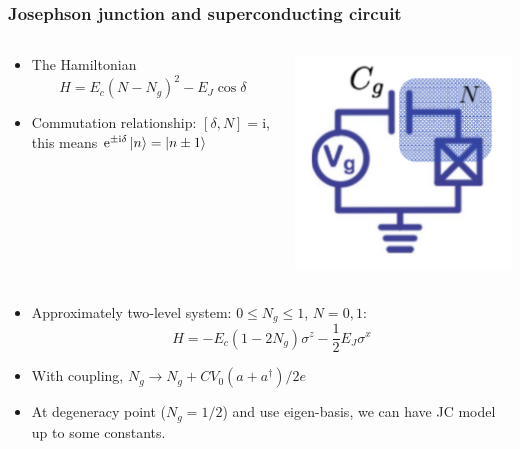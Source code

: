 \documentclass[xcolor=dvipsnames,hyperref={CJKbookmarks=true},aspectratio=169]{beamer}
\newcommand\mi{\mathrm{i}}
\newcommand\e{\mathrm{e}}
\begin{document}
\begin{frame}[t]\frametitle{Josephson junction and superconducting circuit}
\begin{columns}
	\begin{column}{0.75\linewidth}
	\begin{itemize}
		\item The Hamiltonian
		$$
			H = E_c (N-N_g)^2 - E_J\cos\delta
		$$
		\item Commutation relationship: $[\delta, N] = \mi$, this means 
		$\e^{\pm\mi\delta}\ket{n} = \ket{n\pm 1}$
	\end{itemize}
	\end{column}%
	\begin{column}{0.25\linewidth}
	\includegraphics[width=\linewidth]{copper_pair_box.pdf}
	\end{column}
\end{columns}
\begin{itemize}
	\item Approximately two-level system: $0\le N_g \le 1$, $N = 0, 1$: 
	$$
	H = -E_c(1-2N_g) \sigma^z - \frac 12 E_J\sigma^x
	$$
	\item With coupling, $N_g \longrightarrow N_g + CV_0 (a + a^\dag)/2e$
	\item At degeneracy point ($N_g = 1/2$) and use eigen-basis, we can have JC model up to some constants. 
\end{itemize}
\end{frame}
\end{document}
